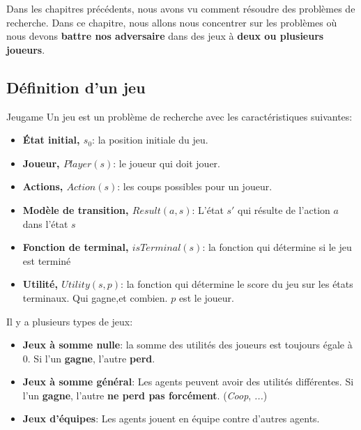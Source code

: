 Dans les chapitres précédents, nous avons vu comment résoudre des problèmes de recherche. 
Dans ce chapitre, nous allons nous concentrer sur les problèmes où nous devons \textbf{battre nos adversaire} 
dans des jeux à \textbf{deux ou plusieurs joueurs}.

\subsection{Définition d'un jeu} %
\label{sub:definition_d_un_jeu}

\begin{definition}{Jeu}{game}
    Un jeu est un problème de recherche avec les caractéristiques suivantes:
    \begin{itemize}
        \item \textbf{État initial, $s_0$}: la position initiale du jeu.
        \item \textbf{Joueur, $Player(s)$}: le joueur qui doit jouer.
        \item \textbf{Actions, $Action(s)$}: les coups possibles pour un joueur.
        \item \textbf{Modèle de transition, $Result(a, s)$}: L'état $s'$ qui résulte de l'action $a$ dans l'état $s$
        \item \textbf{Fonction de terminal, $isTerminal(s)$}: la fonction qui détermine si le jeu est terminé
        \item \textbf{Utilité, $Utility(s, p)$}: la fonction qui détermine le score du jeu sur les états terminaux. Qui gagne,et combien.
            $p$ est le joueur.
    \end{itemize} 
\end{definition}
\begin{note}
    Il y a plusieurs types de jeux:
    \begin{itemize}
        \item \textbf{Jeux à somme nulle}: la somme des utilités des joueurs est toujours égale à 0. Si l'un \textbf{gagne}, l'autre \textbf{perd}.
        \item \textbf{Jeux à somme général}: Les agents peuvent avoir des utilités différentes. Si l'un \textbf{gagne}, l'autre \textbf{ne perd pas forcément}. (\textit{Coop}, \textit{...})
        \item \textbf{Jeux d'équipes}: Les agents jouent en équipe contre d'autres agents.
    \end{itemize}
\end{note}

